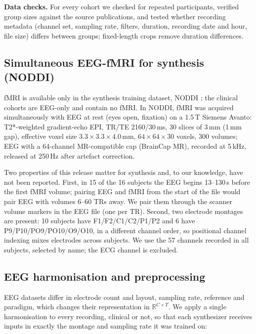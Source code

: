 \documentclass[pdflatex,referee,sn-basic]{sn-jnl}%
\begin{document}
\noindent\textbf{Data checks.} For every cohort we checked for repeated participants, verified group sizes against the source publications, and tested whether recording metadata (channel set, sampling rate, filters, duration, recording date and hour, file size) differs between groups; fixed-length crops remove duration differences.

\subsection{Simultaneous EEG-fMRI for synthesis (NODDI)}\label{section:fmri_data}

fMRI is available only in the synthesis training dataset, NODDI \cite{dataset_01,deligianni2016}; the clinical cohorts are EEG-only and contain no fMRI. In NODDI, fMRI was acquired simultaneously with EEG at rest (eyes open, fixation) on a 1.5\,T Siemens Avanto: T2*-weighted gradient-echo EPI, TR/TE 2160/30\,ms, 30 slices of 3\,mm (1\,mm gap), effective voxel size $3.3\times3.3\times4.0$\,mm, $64\times64\times30$ voxels, 300 volumes; EEG with a 64-channel MR-compatible cap (BrainCap MR), recorded at 5\,kHz, released at 250\,Hz after artefact correction.

Two properties of this release matter for synthesis and, to our knowledge, have not been reported. First, in 15 of the 16 subjects the EEG begins 13--130\,s before the first fMRI volume; pairing EEG and fMRI from the start of the file would pair EEG with volumes 6--60 TRs away. We pair them through the scanner volume markers in the EEG file (one per TR). Second, two electrode montages are present: 10 subjects have F1/F2/C1/C2/P1/P2 and 6 have P9/P10/PO9/PO10/O9/O10, in a different channel order, so positional channel indexing mixes electrodes across subjects. We use the 57 channels recorded in all subjects, selected by name; the ECG channel is excluded.

\subsection{EEG harmonisation and preprocessing}\label{section:adaptation}

EEG datasets differ in electrode count and layout, sampling rate, reference and paradigm, which changes their representation in $\mathbb{R}^{C \times T}$. We apply a single harmonisation to every recording, clinical or not, so that each synthesizer receives inputs in exactly the montage and sampling rate it was trained on:
\end{document}
